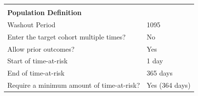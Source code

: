 \documentclass[]{book}
\begin{document}
\begin{longtable}[]{@{}ll@{}}
\begin{minipage}[t]{0.51\columnwidth}
\strut
\end{minipage}\tabularnewline
\begin{minipage}[t]{0.42\columnwidth}\raggedright\strut
\textbf{Population Definition}\strut
\end{minipage} & \begin{minipage}[t]{0.51\columnwidth}\raggedright\strut
\strut
\end{minipage}\tabularnewline
\begin{minipage}[t]{0.42\columnwidth}\raggedright\strut
Washout Period\strut
\end{minipage} & \begin{minipage}[t]{0.51\columnwidth}\raggedright\strut
1095\strut
\end{minipage}\tabularnewline
\begin{minipage}[t]{0.42\columnwidth}\raggedright\strut
Enter the target cohort multiple times?\strut
\end{minipage} & \begin{minipage}[t]{0.51\columnwidth}\raggedright\strut
No\strut
\end{minipage}\tabularnewline
\begin{minipage}[t]{0.42\columnwidth}\raggedright\strut
Allow prior outcomes?\strut
\end{minipage} & \begin{minipage}[t]{0.51\columnwidth}\raggedright\strut
Yes\strut
\end{minipage}\tabularnewline
\begin{minipage}[t]{0.42\columnwidth}\raggedright\strut
Start of time-at-risk\strut
\end{minipage} & \begin{minipage}[t]{0.51\columnwidth}\raggedright\strut
1 day\strut
\end{minipage}\tabularnewline
\begin{minipage}[t]{0.42\columnwidth}\raggedright\strut
End of time-at-risk\strut
\end{minipage} & \begin{minipage}[t]{0.51\columnwidth}\raggedright\strut
365 days\strut
\end{minipage}\tabularnewline
\begin{minipage}[t]{0.42\columnwidth}\raggedright\strut
Require a minimum amount of time-at-risk?\strut
\end{minipage} & \begin{minipage}[t]{0.51\columnwidth}\raggedright\strut
Yes (364 days)\strut
\end{minipage}\tabularnewline

\end{longtable}
\end{document}
